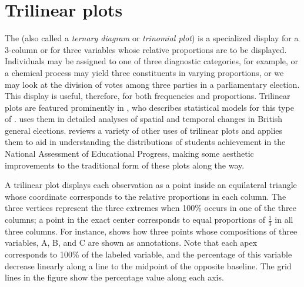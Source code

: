 \section{Trilinear plots}\label{sec:twoway-trilinear}
The 
(also called a \emph{ternary diagram} or \emph{trinomial plot})
is a specialized display for a 3-column \ctab{} or for
three variables whose relative proportions are to be displayed.
Individuals may be assigned to one of three diagnostic categories,
for example, or a chemical process may yield three constituents
in varying proportions, or we may look at the division of votes
among three parties in a parliamentary election.
This display is useful, therefore, for both frequencies
and proportions.
Trilinear plots are featured prominently in \citet{Aitchison:86},
who describes statistical models for this type of
.  \citet{Upton:76,Upton:94}
uses them in detailed analyses of spatial and temporal changes in
British general elections.
\citet{Wainer:96} reviews a variety of other uses of trilinear
plots and applies them to aid in understanding the distributions
of students achievement in the
National Assessment of Educational Progress,
making some aesthetic improvements to the traditional form of these
plots along the way.

A trilinear plot displays each observation as a point inside
an equilateral triangle whose coordinate corresponds to the
relative proportions in each column.
The three vertices represent the three extremes when 100\%
occurs in one of the three columns; a point in the exact
center corresponds to equal proportions of $\frac13$ in
all three columns.  For instance, 
shows how three points whose compositions of three variables,
A, B, and C are shown as annotations.
Note that each apex corresponds to 100\% of the labeled
variable, and the percentage of this variable decrease
linearly along a line to the midpoint of the opposite
baseline.
The grid lines in the figure show the percentage value along
each axis.

